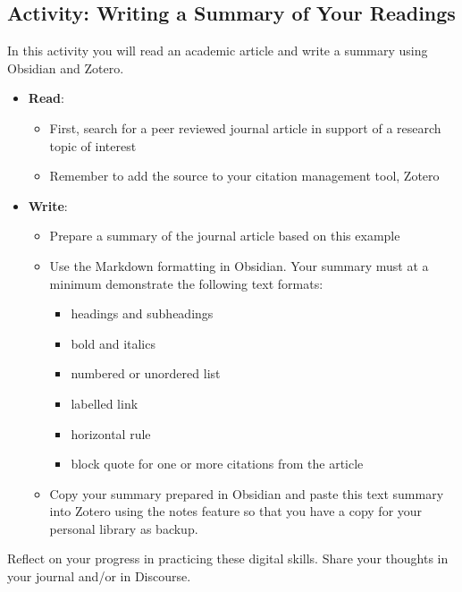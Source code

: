 \documentclass[
  letterpaper,
  DIV=11,
  numbers=noendperiod]{scrreprt}
\providecommand{\tightlist}{%
  \setlength{\itemsep}{0pt}\setlength{\parskip}{0pt}}\usepackage{longtable,booktabs,array}
\begin{document}
\subsection{Activity: Writing a Summary of Your
Readings}\label{activity-writing-a-summary-of-your-readings}

\begin{tcolorbox}[enhanced jigsaw, toprule=.15mm, colback=white, colframe=quarto-callout-note-color-frame, bottomtitle=1mm, leftrule=.75mm, coltitle=black, titlerule=0mm, rightrule=.15mm, colbacktitle=quarto-callout-note-color!10!white, left=2mm, title={Learning Activity}, opacitybacktitle=0.6, opacityback=0, breakable, toptitle=1mm, arc=.35mm, bottomrule=.15mm]

In this activity you will read an academic article and write a summary
using Obsidian and Zotero.

\begin{itemize}
\tightlist
\item
  \textbf{Read}:

  \begin{itemize}
  \tightlist
  \item
    First, search for a peer reviewed journal article in support of a
    research topic of interest
  \item
    Remember to add the source to your citation management tool, Zotero
  \end{itemize}
\item
  \textbf{Write}:

  \begin{itemize}
  \tightlist
  \item
    Prepare a summary of the journal article based on this example
  \item
    Use the Markdown formatting in Obsidian. Your summary must at a
    minimum demonstrate the following text formats:

    \begin{itemize}
    \tightlist
    \item
      headings and subheadings
    \item
      bold and italics
    \item
      numbered or unordered list
    \item
      labelled link
    \item
      horizontal rule
    \item
      block quote for one or more citations from the article
    \end{itemize}
  \item
    Copy your summary prepared in Obsidian and paste this text summary
    into Zotero using the notes feature so that you have a copy for your
    personal library as backup.
  \end{itemize}
\end{itemize}

Reflect on your progress in practicing these digital skills. Share your
thoughts in your journal and/or in Discourse.

\end{tcolorbox}
\end{document}
